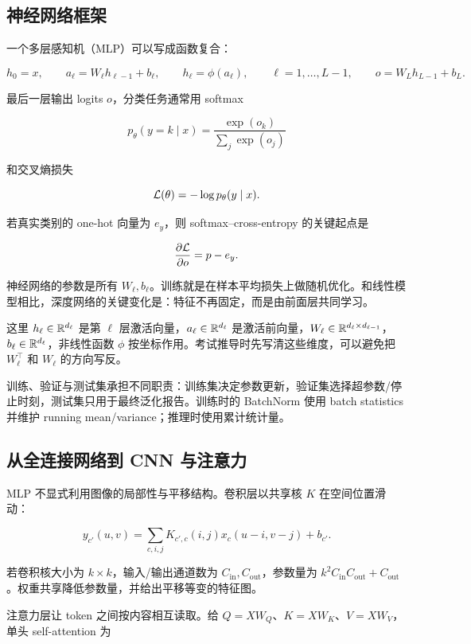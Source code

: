 \documentclass[11pt]{ctexart}
\begin{document}
\subsection{神经网络框架}

一个多层感知机（MLP）可以写成函数复合：

\[
  h_0=x,
  \qquad
  a_\ell=W_\ell h_{\ell-1}+b_\ell,
  \qquad
  h_\ell=\phi(a_\ell),
  \qquad \ell=1,\ldots,L-1,
  \qquad
  o=W_Lh_{L-1}+b_L.
\]

最后一层输出 logits \(o\)，分类任务通常用 softmax

\[
  p_\theta(y=k\mid x)
  =
  \frac{\exp(o_k)}{\sum_{j}\exp(o_j)}
\]

和交叉熵损失

\[
  \mathcal{L}(\theta)
  =
  -\log p_\theta(y\mid x).
\]

若真实类别的 one-hot 向量为 \(e_y\)，则 softmax--cross-entropy 的关键起点是

\[
  \frac{\partial\mathcal{L}}{\partial o}=p-e_y.
\]

神经网络的参数是所有 \(W_\ell,b_\ell\)。训练就是在样本平均损失上做随机优化。和线性模型相比，深度网络的关键变化是：特征不再固定，而是由前面层共同学习。

这里 \(h_\ell\in\mathbb{R}^{d_\ell}\) 是第 \(\ell\) 层激活向量，\(a_\ell\in\mathbb{R}^{d_\ell}\) 是激活前向量，\(W_\ell\in\mathbb{R}^{d_\ell\times d_{\ell-1}}\)，\(b_\ell\in\mathbb{R}^{d_\ell}\)，非线性函数 \(\phi\) 按坐标作用。考试推导时先写清这些维度，可以避免把 \(W_\ell^\top\) 和 \(W_\ell\) 的方向写反。

训练、验证与测试集承担不同职责：训练集决定参数更新，验证集选择超参数/停止时刻，测试集只用于最终泛化报告。训练时的 BatchNorm 使用 batch statistics 并维护 running mean/variance；推理时使用累计统计量。

\subsection{从全连接网络到 CNN 与注意力}

MLP 不显式利用图像的局部性与平移结构。卷积层以共享核 \(K\) 在空间位置滑动：

\[
  y_{c'}(u,v)=\sum_{c,i,j}K_{c',c}(i,j)x_c(u-i,v-j)+b_{c'}.
\]

若卷积核大小为 \(k\times k\)，输入/输出通道数为 \(C_{\mathrm{in}},C_{\mathrm{out}}\)，参数量为 \(k^2C_{\mathrm{in}}C_{\mathrm{out}}+C_{\mathrm{out}}\)。权重共享降低参数量，并给出平移等变的特征图。

注意力层让 token 之间按内容相互读取。给 \(Q=XW_Q\)、\(K=XW_K\)、\(V=XW_V\)，单头 self-attention 为
\end{document}
